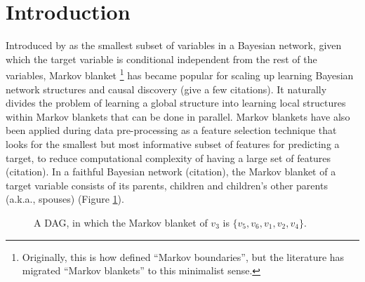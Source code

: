 \section{Introduction}
Introduced by \citeauthor{pearl1988probabilistic} as the smallest subset of variables in a Bayesian network, given which the target variable is conditional independent from the rest of the variables, Markov blanket \footnote{Originally, this is how \citeauthor{pearl1988probabilistic}
  defined ``Markov boundaries'', but the literature has migrated
  ``Markov blankets'' to this minimalist sense.}
  has became popular for scaling up learning Bayesian network structures and causal discovery (give a few citations). It naturally divides the problem of learning a global structure into learning local structures within Markov blankets that can be done in parallel. Markov blankets have also been applied during data pre-processing as a feature selection technique that looks for the smallest but most informative subset of features for predicting a target, to reduce computational complexity of having a large set of features (citation). In a faithful Bayesian network (citation), the Markov blanket of a target variable consists of its parents, children and children's other parents (a.k.a., spouses) (Figure \ref{fg:mb_example}).  
\begin{figure}[H]
\centering
{}
\caption{A DAG, in which the Markov blanket of $v_3$ is $\{v_5,v_6,v_1,v_2,v_4\}$.}
\label{fg:mb_example}
\end{figure}
